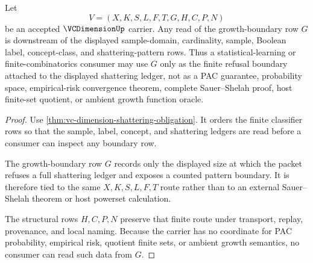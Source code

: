 \begin{theorem}
\label{thm:vc-dimension-growth-boundary-obligation}
Let
$$
V=(X,K,S,L,F,T,G,H,C,P,N)
$$
be an accepted $\VCDimensionUp$ carrier. Any read of the growth-boundary row
$G$ is downstream of the displayed sample-domain, cardinality, sample,
Boolean label, concept-class, and shattering-pattern rows. Thus a
statistical-learning or finite-combinatorics consumer may use $G$ only as the
finite refusal boundary attached to the displayed shattering ledger, not as a
PAC guarantee, probability space, empirical-risk convergence theorem,
complete Sauer--Shelah proof, host finite-set quotient, or ambient growth
function oracle.
\end{theorem}
\begin{proof}
Use \autoref{thm:vc-dimension-shattering-obligation}. It orders the finite
classifier rows so that the sample, label, concept, and shattering ledgers are
read before a consumer can inspect any boundary row.

The growth-boundary row $G$ records only the displayed size at which the
packet refuses a full shattering ledger and exposes a counted pattern
boundary. It is therefore tied to the same $X,K,S,L,F,T$ route rather than to
an external Sauer--Shelah theorem or host powerset calculation.

The structural rows $H,C,P,N$ preserve that finite route under transport,
replay, provenance, and local naming. Because the carrier has no coordinate
for PAC probability, empirical risk, quotient finite sets, or ambient growth
semantics, no consumer can read such data from $G$.
\end{proof}



